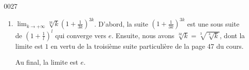 \begin{corrige}{0027}
\begin{enumerate}
\item 
$ \lim_{k \to  +\infty } \sqrt[3k]{k} (1 + \frac{1}{3k})^{3k} $.
D'abord, la suite $\left( 1+\frac{ 1 }{ 3k } \right)^{3k}$ est une sous suite de $\left( 1+\frac{ 1 }{ l } \right)^l$ qui converge vers $e$. Ensuite, nous avons $\sqrt[3k]{k}=\sqrt[3]{\sqrt[k]{k}}$, dont la limite est $1$ en vertu de la troisième suite particulière de la page 47 du cours.

Au final, la limite est $e$.

\end{enumerate}

\end{corrige}
